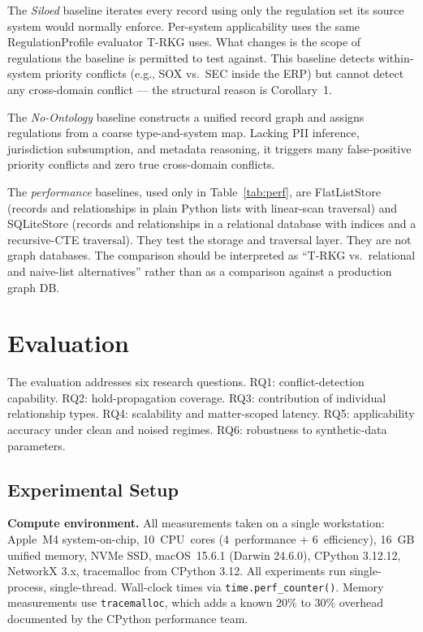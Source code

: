 \documentclass{ieeeaccess}
\begin{document}
The \textit{Siloed} baseline iterates every record using only the regulation set its source system would normally enforce. Per-system applicability uses the same RegulationProfile evaluator T-RKG uses. What changes is the scope of regulations the baseline is permitted to test against. This baseline detects within-system priority conflicts (e.g., SOX vs.\ SEC inside the ERP) but cannot detect any cross-domain conflict --- the structural reason is Corollary~1.

The \textit{No-Ontology} baseline constructs a unified record graph and assigns regulations from a coarse type-and-system map. Lacking PII inference, jurisdiction subsumption, and metadata reasoning, it triggers many false-positive priority conflicts and zero true cross-domain conflicts.

The \textit{performance} baselines, used only in Table~\ref{tab:perf}, are FlatListStore (records and relationships in plain Python lists with linear-scan traversal) and SQLiteStore (records and relationships in a relational database with indices and a recursive-CTE traversal). They test the storage and traversal layer. They are not graph databases. The comparison should be interpreted as ``T-RKG vs.\ relational and naive-list alternatives'' rather than as a comparison against a production graph DB.

\section{Evaluation}
\label{sec:eval}

The evaluation addresses six research questions. RQ1: conflict-detection capability. RQ2: hold-propagation coverage. RQ3: contribution of individual relationship types. RQ4: scalability and matter-scoped latency. RQ5: applicability accuracy under clean and noised regimes. RQ6: robustness to synthetic-data parameters.

\subsection{Experimental Setup}

\textbf{Compute environment.} All measurements taken on a single workstation: Apple~M4 system-on-chip, 10~CPU~cores (4~performance + 6~efficiency), 16~GB unified memory, NVMe SSD, macOS~15.6.1 (Darwin 24.6.0), CPython 3.12.12, NetworkX 3.x, tracemalloc from CPython 3.12. All experiments run single-process, single-thread. Wall-clock times via \texttt{time.perf\_counter()}. Memory measurements use \texttt{tracemalloc}, which adds a known 20\% to 30\% overhead documented by the CPython performance team.
\end{document}
